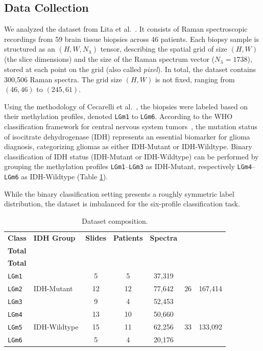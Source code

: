 \documentclass[12pt]{article}
\theoremstyle{paper}
\begin{document}
\subsection{Data Collection}
\label{sec:data_col}

We analyzed the dataset from Lita et al.~\cite{apollonov2024raman}. It consists of Raman spectroscopic recordings from 59 brain tissue biopsies across 46 patients. Each biopsy sample is structured as an $(H,W,N_\lambda)$ tensor, describing the spatial grid of size $(H,W)$ (the slice dimensions) and the size of the Raman spectrum vector ($N_\lambda = 1738$), stored at each point on the grid (also called \textit{pixel}). In total, the dataset contains 300,506 Raman spectra. The grid size $(H,W)$ is not fixed, ranging from $(46,46)$ to $(245,61)$. 

Using the methodology of Cecarelli et al.~\cite{Ceccarelli2016}, the biopsies were labeled based on their methylation profiles, denoted \texttt{LGm1} to \texttt{LGm6}. According to the WHO classification framework for central nervous system tumors~\cite{louis2021who}, the mutation status of isocitrate dehydrogenase (IDH) represents an essential biomarker for glioma diagnosis, categorizing gliomas as either IDH-Mutant or IDH-Wildtype. Binary classification of IDH status (IDH-Mutant or IDH-Wildtype) can be performed by grouping the methylation profiles \texttt{LGm1}--\texttt{LGm3} as IDH-Mutant, respectively \texttt{LGm4}--\texttt{LGm6} as IDH-Wildtype (Table \ref{tab:dataset}).

While the binary classification setting presents a roughly symmetric label distribution, the dataset is imbalanced for the six-profile classification task. 

\begin{table}[H]
\small
\centering
\begin{tabular}{llccccc}
\toprule
\textbf{Class} & \textbf{IDH Group} & \textbf{Slides} & \textbf{Patients} & \textbf{Spectra} & \makecell{\textbf{Slides} \\ \textbf{Total}} & \makecell{\textbf{Spectra} \\ \textbf{Total}} \\
\midrule
\texttt{LGm1} &   & 5 & 5 & 37,319 \\
\texttt{LGm2} & IDH-Mutant   & 12 & 12 & 77,642 & 26 & 167,414\\
\texttt{LGm3} &  & 9 & 4 & 52,453 \\
\midrule
\texttt{LGm4} &  & 13 & 10 & 50,660  \\
\texttt{LGm5} & IDH-Wildtype & 15 & 11 & 62,256 &  33 & 133,092\\
\texttt{LGm6} &  & 5 & 4 & 20,176  \\
\bottomrule
\end{tabular}
\caption{Dataset composition.}
\label{tab:dataset}
\end{table}
\end{document}
